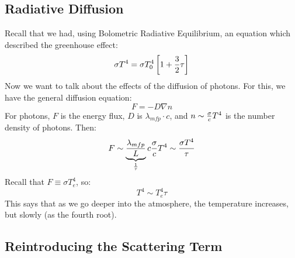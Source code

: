 \documentclass[11pt]{article}
\begin{document}
\subsection*{ Radiative Diffusion}

Recall that we had, using Bolometric Radiative Equilibrium, an equation which
described the greenhouse effect:
$$\sigma T^4=\sigma T_0^4\left[1+{3\over2}\tau\right]$$
Now we want to talk about the effects of the diffusion of photons.  For this,
we have the general diffusion equation:
$$F=-D\nabla n$$
For photons, $F$ is the energy flux, $D$ is $\lambda_{mfp}\cdot c$, 
and $n\sim{\sigma\over c}T^4$ is the number density of photons.  Then:
$$F\sim\underbrace{\lambda_{mfp}\over L}_{1\over\tau}c{\sigma\over c}T^4
\sim{\sigma T^4\over\tau}$$
Recall that $F\equiv\sigma T_e^4$, so:
$$T^4\sim T_e^4\tau$$
This says that as we go deeper into the atmosphere, the temperature increases,
but slowly (as the fourth root).  

\subsection*{ Reintroducing the Scattering Term}
\end{document}
